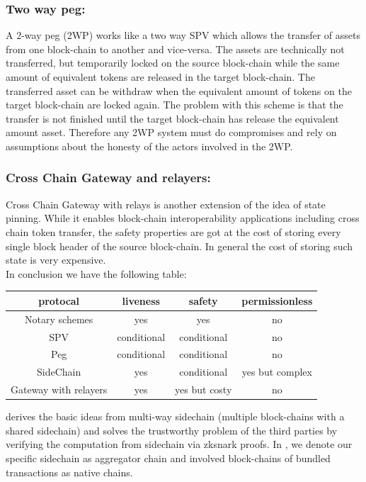 \documentclass[pageno]{jpaper}
\begin{document}
\subsubsection{Two way peg:}
    A 2-way peg (2WP) works like a two way SPV which allows the transfer of assets from one block-chain to another and vice-versa. The assets are technically not transferred, but temporarily locked on the source block-chain while the same amount of equivalent tokens are released in the target block-chain. The transferred asset can be withdraw when the equivalent amount of tokens on the target block-chain are locked again. The problem with this scheme is that the transfer is not finished until the target block-chain has release the equivalent amount asset. Therefore any 2WP system must do compromises and rely on assumptions about the honesty of the actors involved in the 2WP.
\\
\subsubsection{Cross Chain Gateway and relayers:}
    Cross Chain Gateway with relays is another extension of the idea of state pinning. While it enables block-chain interoperability applications including cross chain token transfer, the safety properties are got at the cost of storing every single block header of the source block-chain\cite{belchior2021survey}. In general the cost of storing such state is very expensive.
\\
\newline
In conclusion we have the following table:
\begin{table}[h]
\small
\centering
\begin{tabular}{ | c | c | c | c | }
\hline
protocal & liveness & safety & permissionless \\
\hline
Notary schemes & yes & yes & no\\
\hline
SPV & conditional & conditional & no \\
\hline
Peg & conditional & conditional & no \\
\hline
SideChain & yes & conditional & yes but complex \\ 
\hline
Gateway with relayers & yes & yes but costy & no \\ 
\hline
\end{tabular}
\end{table}

\dprotocol derives the basic ideas from multi-way sidechain (multiple block-chains with a shared sidechain) and solves the trustworthy problem of the third parties by verifying the computation from sidechain via zksnark proofs. In \dprotocol, we denote our specific sidechain as aggregator chain and involved block-chains of bundled transactions as native chains.
\end{document}
